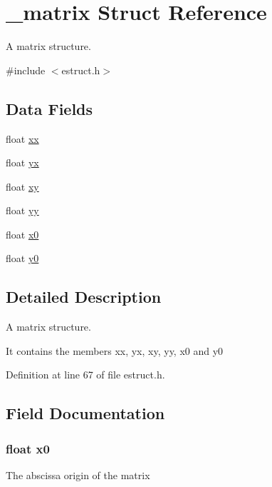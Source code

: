\hypertarget{struct__matrix}{\section{\-\_\-matrix Struct Reference}
\label{struct__matrix}
}


A matrix structure.  




{\ttfamily \#include $<$estruct.\-h$>$}

\subsection*{Data Fields}
\begin{DoxyCompactItemize}
\item 
float \hyperlink{struct__matrix_a9fb9d00fbbf390e0263bcc204b03c7c8}{xx}
\item 
float \hyperlink{struct__matrix_a8e1608facba0c31efe99d65811fab570}{yx}
\item 
float \hyperlink{struct__matrix_a83a7590defc35766f789fbbf7fc41590}{xy}
\item 
float \hyperlink{struct__matrix_a342cbf7f29a65a0d1a2949ef4675008e}{yy}
\item 
float \hyperlink{struct__matrix_a3c9556645d92e863376a4063a3ad7001}{x0}
\item 
float \hyperlink{struct__matrix_adf19b8ba42d497d3093c3a51b1a32cca}{y0}
\end{DoxyCompactItemize}


\subsection{Detailed Description}
A matrix structure. 

It contains the members xx, yx, xy, yy, x0 and y0 

Definition at line 67 of file estruct.\-h.



\subsection{Field Documentation}
\hypertarget{struct__matrix_a3c9556645d92e863376a4063a3ad7001}{
\subsubsection[{x0}]{\setlength{\rightskip}{0pt plus 5cm}float x0}}\label{struct__matrix_a3c9556645d92e863376a4063a3ad7001}
The abscissa origin of the matrix 

